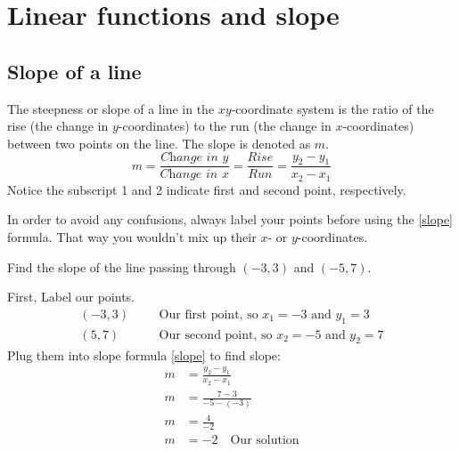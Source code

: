 \chapter{Linear functions and slope}
\section{Slope of a line}
The steepness or slope of a line in the $xy$-coordinate system is the ratio of the rise (the change in $y$-coordinates) to the run (the change in $x$-coordinates) between two points on the line. The slope is denoted as $m$. 
\begin{equation}
	m= \frac{\textit{Change in $y$}}{\textit{Change in $x$}} = \frac{Rise}{Run} = \frac{y_2-y_1}{x_2-x_1}
	 \label{slope}
\end{equation}
Notice the subscript 1 and 2 indicate first and second point, respectively.
\vspace{0.5cm}
\begin{center}
\end{center}

\vspace{0.5cm}
In order to avoid any confusions, always label your points before using the \eqref{slope} formula. That way you wouldn't mix up their $x$- or $y$-coordinates.
\begin{exa}
 	Find the slope of the line passing through $(-3,3)$ and $(-5,7)$.
\end{exa}
First, Label our points.
\begin{align*}
		(-3,3)&	&&\text{Our first point, so $x_1=-3$ and $y_1=3$}\\
        (5,7)&  &&\text{Our second point, so $x_2=-5$ and $y_2=7$}
\end{align*}
Plug them into slope formula \eqref{slope} to find slope:
\begin{align*}
	m &=\frac{y_2-y_1}{x_2-x_1} \\
    m &=  \frac{7-3}{-5-(-3)} \\
    m &= \frac{4}{-2} \\
    m &= -2 \quad \text{Our solution}
\end{align*}
